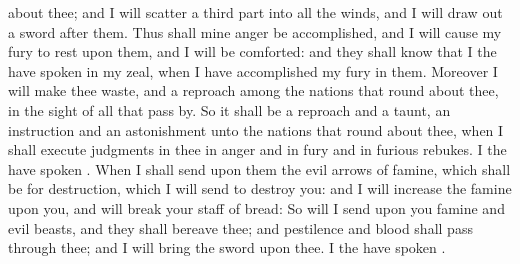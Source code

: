 {about thee; and I will
scatter a third
part into all the
winds, and I will draw
out a
sword
after them.
Thus shall mine
anger be
accomplished, and I will cause my
fury to
rest upon them, and I will be
comforted: and they shall
know that I the
{} have
spoken
{} in my
zeal, when I have
accomplished my
fury in them.
Moreover I will
make thee
waste, and a
reproach among the
nations that
{} round
about thee, in the
sight of all that pass
by.
So it shall be a
reproach and a
taunt, an
instruction and an
astonishment unto the
nations that
{} round
about thee, when I shall
execute
judgments in thee in
anger and in
fury and in
furious
rebukes. I the
{} have
spoken
{}.
When I shall
send upon them the
evil
arrows of
famine, which shall be for
{}
destruction,
{} which I will
send to
destroy you: and I will
increase the
famine upon you, and will
break your
staff of
bread:
So will I
send upon you
famine and
evil
beasts, and they shall
bereave thee; and
pestilence and
blood shall pass
through thee; and I will
bring the
sword upon thee. I the
{} have
spoken
{}.

}
